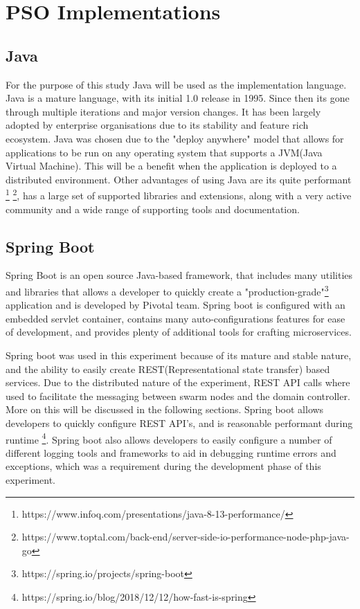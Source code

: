 \documentclass[oneside,12pt]{book}
\begin{document}
\section{PSO Implementations}

\subsection{Java}
For the purpose of this study Java will be used as the implementation language. Java is a mature language, with its initial 1.0 release in 1995. Since then its gone through multiple iterations and major version changes. It has been largely adopted by enterprise organisations due to its stability and feature rich ecosystem. Java was chosen due to the "deploy anywhere" model that allows for applications to be run on any operating system that supports a JVM(Java Virtual Machine). This will be a benefit when the application is deployed to a distributed environment. Other advantages of using Java are its quite performant \footnote{https://www.infoq.com/presentations/java-8-13-performance/} \footnote{https://www.toptal.com/back-end/server-side-io-performance-node-php-java-go}, has a large set of supported libraries and extensions, along with a very active community and a wide range of supporting tools and documentation.

\subsection{Spring Boot}
Spring Boot is an open source Java-based framework, that includes many utilities and libraries that allows a developer to quickly create a "production-grade"\footnote{https://spring.io/projects/spring-boot} application and is developed by Pivotal team. Spring boot is configured with an embedded servlet container, contains many auto-configurations features for ease of development, and provides plenty of additional tools for crafting microservices. 

Spring boot was used in this experiment because of its mature and stable nature, and the ability to easily create REST(Representational state transfer) based services. Due to the distributed nature of the experiment, REST API calls where used to facilitate the messaging between swarm nodes and the domain controller. More on this will be discussed in the following sections. Spring boot allows developers to quickly configure REST API's, and is reasonable performant during runtime \footnote{https://spring.io/blog/2018/12/12/how-fast-is-spring}. Spring boot also allows developers to easily configure a number of different logging tools and frameworks to aid in debugging runtime errors and exceptions, which was a requirement during the development phase of this experiment. 
\end{document}
